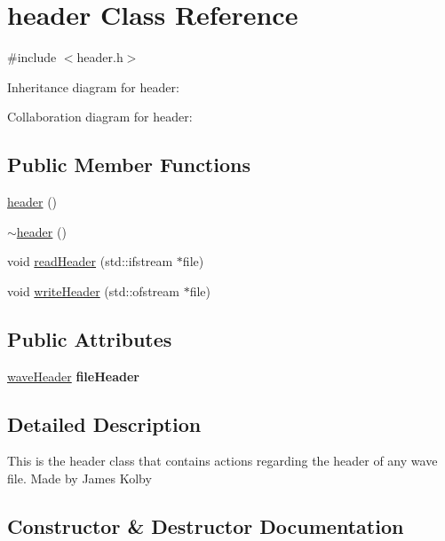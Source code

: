 \hypertarget{classheader}{}\section{header Class Reference}
\label{classheader}


{\ttfamily \#include $<$header.\+h$>$}



Inheritance diagram for header\+:


Collaboration diagram for header\+:
\subsection*{Public Member Functions}
\begin{DoxyCompactItemize}
\item 
\hyperlink{classheader_a32704b504ebe55350682c687a340c80e}{header} ()
\item 
\hyperlink{classheader_a66f724a5dec3b403a4079a33b54ce86a}{$\sim$header} ()
\item 
void \hyperlink{classheader_a36c498b1d044ef1477d198e029c15230}{read\+Header} (std\+::ifstream $\ast$file)
\item 
void \hyperlink{classheader_ae2875cfe9124d7b710ed107168cc860d}{write\+Header} (std\+::ofstream $\ast$file)
\end{DoxyCompactItemize}
\subsection*{Public Attributes}
\begin{DoxyCompactItemize}
\item 
\mbox{\label{classheader_a78f970bdabd53df4a03dbc9815c19d78}} 
\hyperlink{structwaveHeader}{wave\+Header} {\bfseries file\+Header}
\end{DoxyCompactItemize}


\subsection{Detailed Description}
This is the header class that contains actions regarding the header of any wave file. Made by James Kolby 

\subsection{Constructor \& Destructor Documentation}
\mbox{\label{classheader_a32704b504ebe55350682c687a340c80e}} 
